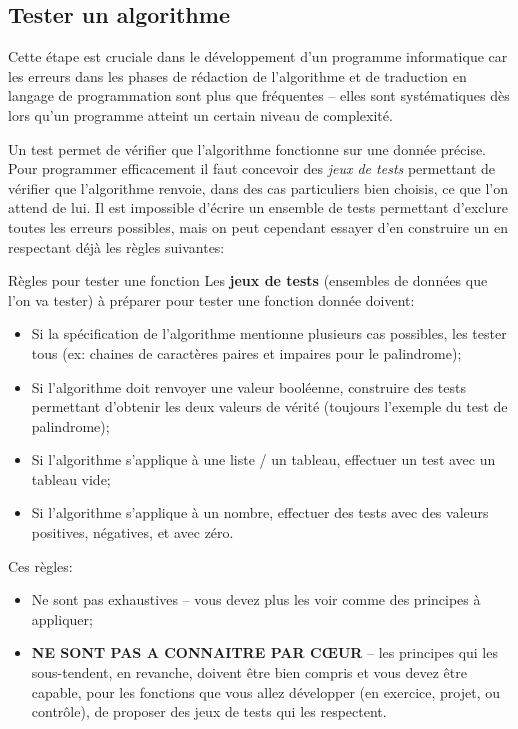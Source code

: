 \documentclass[12pt]{article}
\begin{document}
	\subsection{Tester un algorithme}
	
	Cette étape est cruciale dans le développement d'un programme informatique car les erreurs dans les phases de rédaction de l'algorithme et de traduction en langage de programmation sont plus que fréquentes -- elles sont systématiques dès lors qu'un programme atteint un certain niveau de complexité.
	
	Un test permet de vérifier que l'algorithme fonctionne sur une donnée précise. Pour programmer efficacement il faut concevoir des \textit{jeux de tests} permettant de vérifier que l’algorithme renvoie, dans des cas particuliers bien choisis, ce que l’on attend de lui. Il est impossible d'écrire un ensemble de tests permettant d’exclure toutes les erreurs possibles, mais on peut cependant essayer d'en construire un en respectant déjà les règles suivantes:
	
	\begin{MonAmp}{Règles pour tester une fonction}
			 Les \textbf{jeux de tests} (ensembles de données que l'on va tester) à préparer pour tester une fonction donnée doivent:
			 \begin{itemize}
			 	\item Si la spécification de l'algorithme mentionne plusieurs cas possibles, les tester tous (ex: chaines de caractères paires et impaires pour le palindrome);
			 	\item Si l'algorithme doit renvoyer une valeur booléenne, construire des tests permettant d’obtenir les deux valeurs de vérité (toujours l'exemple du test de palindrome);
			 	\item Si l'algorithme s'applique à une liste / un tableau, effectuer un test avec un tableau vide;
			 	\item Si l'algorithme s'applique à un nombre, effectuer des tests avec des valeurs positives, négatives, et avec zéro.
			 \end{itemize}
			 \vspace{\baselineskip}
			 
			 Ces règles:
			 \begin{itemize}
			 	\item Ne sont pas exhaustives -- vous devez plus les voir comme des principes à appliquer;
			 	\item \textbf{NE SONT PAS A CONNAITRE PAR CŒUR} -- les principes qui les sous-tendent, en revanche, doivent être bien compris et vous devez être capable, pour les fonctions que vous allez développer (en exercice, projet, ou contrôle), de proposer des jeux de tests qui les respectent.
			 \end{itemize}
	\end{MonAmp}
	
\end{document}
